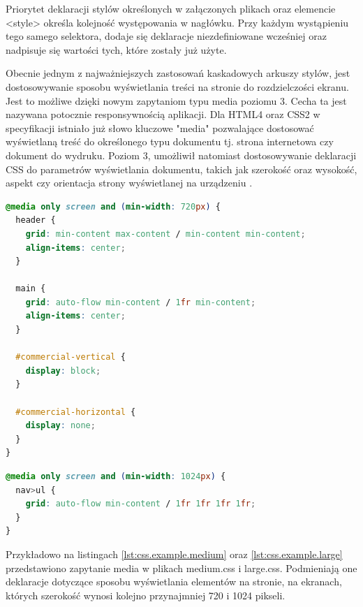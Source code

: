 Priorytet deklaracji stylów określonych w załączonych plikach oraz elemencie <style> określa kolejność występowania w nagłówku. Przy każdym wystąpieniu tego samego selektora, dodaje się deklaracje niezdefiniowane wcześniej oraz nadpisuje się wartości tych, które zostały już użyte.

Obecnie jednym z najważniejszych zastosowań kaskadowych arkuszy stylów, jest dostosowywanie sposobu wyświetlania treści na stronie do rozdzielczości ekranu.  Jest to możliwe dzięki nowym zapytaniom typu media poziomu 3. Cecha ta jest nazywana potocznie responsywnością aplikacji.
Dla HTML4 oraz CSS2 w specyfikacji istniało już słowo kluczowe "media"  pozwalające dostosować wyświetlaną treść do określonego typu dokumentu tj. strona internetowa czy dokument do wydruku. Poziom 3, umożliwił natomiast dostosowywanie deklaracji CSS do parametrów wyświetlania dokumentu, takich jak szerokość oraz wysokość, aspekt czy orientacja strony wyświetlanej na urządzeniu \cite{css.media-queries}.

\begin{lstlisting}[language=CSS, caption=Plik medium.css załączony w nagłówku dokumentu HTML, label=lst:css.example.medium]
@media only screen and (min-width: 720px) {
  header {
    grid: min-content max-content / min-content min-content; 
    align-items: center;
  }
    
  main {
    grid: auto-flow min-content / 1fr min-content;
    align-items: center;
  }

  #commercial-vertical {
    display: block;
  }

  #commercial-horizontal {
    display: none;
  }
}
\end{lstlisting}

\begin{lstlisting}[language=CSS, caption=Plik large.css załączony w nagłówku dokumentu HTML, label=lst:css.example.large]
@media only screen and (min-width: 1024px) {
  nav>ul {
    grid: auto-flow min-content / 1fr 1fr 1fr 1fr;
  }
}
\end{lstlisting}

Przykładowo na listingach \ref{lst:css.example.medium} oraz \ref{lst:css.example.large} przedstawiono zapytanie media w plikach medium.css i large.css. Podmieniają one deklaracje dotyczące sposobu wyświetlania elementów na stronie, na ekranach, których szerokość wynosi kolejno przynajmniej 720 i 1024 pikseli.

